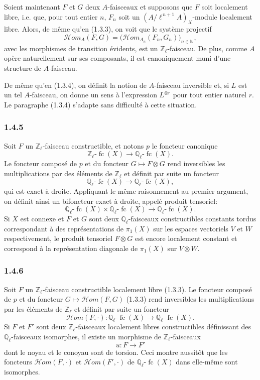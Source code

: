 \documentclass[11pt]{article}
\providecommand{\cHom}{\mathcal{H}om}
\providecommand{\fc}{\operatorname{fc}}
\begin{document}
Soient maintenant \(F\) et \(G\) deux \(A\)-faisceaux et supposons que \(F\) soit localement libre, i.e. que, pour tout entier \(n\), \(F_n\) soit un \((A/\ell^{\,n+1}A)_X\)-module localement libre. Alors, de même qu'en (1.3.3), on voit que le système projectif
\[
\cHom_A(F,G)=\bigl(\cHom_{A_n}(F_n,G_n)\bigr)_{n\in\mathbb N},
\]
avec les morphismes de transition évidents, est un \(\mathbb Z_\ell\)-faisceau. De plus, comme \(A\) opère naturellement sur ses composants, il est canoniquement muni d'une structure de \(A\)-faisceau.

De même qu'en (1.3.4), on définit la notion de \(A\)-faisceau inversible et, si \(L\) est un tel \(A\)-faisceau, on donne un sens à l'expression \(L^{\otimes r}\) pour tout entier naturel \(r\). Le paragraphe (1.3.4) s'adapte sans difficulté à cette situation.

\subsubsection*{1.4.5}
Soit \(F\) un \(\mathbb Z_\ell\)-faisceau constructible, et notons \(p\) le foncteur canonique
\[
\mathbb Z_\ell\text{-}\fc(X)\longrightarrow \mathbb Q_\ell\text{-}\fc(X).
\]
Le foncteur composé de \(p\) et du foncteur \(G\mapsto F\otimes G\) rend inversibles les multiplications par des éléments de \(\mathbb Z_\ell\) et définit par suite un foncteur
\[
\mathbb Q_\ell\text{-}\fc(X)\longrightarrow \mathbb Q_\ell\text{-}\fc(X),
\]
qui est exact à droite. Appliquant le même raisonnement au premier argument, on définit ainsi un bifoncteur exact à droite, appelé produit tensoriel:
\[
\mathbb Q_\ell\text{-}\fc(X)\times \mathbb Q_\ell\text{-}\fc(X)
\longrightarrow \mathbb Q_\ell\text{-}\fc(X).
\]
Si \(X\) est connexe et \(F\) et \(G\) sont deux \(\mathbb Q_\ell\)-faisceaux constructibles constants tordus correspondant à des représentations de \(\pi_1(X)\) sur les espaces vectoriels \(V\) et \(W\) respectivement, le produit tensoriel \(F\otimes G\) est encore localement constant et correspond à la représentation diagonale de \(\pi_1(X)\) sur \(V\otimes W\).

\subsubsection*{1.4.6}
Soit \(F\) un \(\mathbb Z_\ell\)-faisceau constructible localement libre (1.3.3). Le foncteur composé de \(p\) et du foncteur \(G\mapsto\cHom(F,G)\) (1.3.3) rend inversibles les multiplications par les éléments de \(\mathbb Z_\ell\) et définit par suite un foncteur
\[
\cHom(F,\cdot):\mathbb Q_\ell\text{-}\fc(X)\longrightarrow \mathbb Q_\ell\text{-}\fc(X).
\]
Si \(F\) et \(F'\) sont deux \(\mathbb Z_\ell\)-faisceaux localement libres constructibles définissant des \(\mathbb Q_\ell\)-faisceaux isomorphes, il existe un morphisme de \(\mathbb Z_\ell\)-faisceaux
\[
u:F\longrightarrow F'
\]
dont le noyau et le conoyau sont de torsion. Ceci montre aussitôt que les foncteurs \(\cHom(F,\cdot)\) et \(\cHom(F',\cdot)\) de \(\mathbb Q_\ell\text{-}\fc(X)\) dans elle-même sont isomorphes.
\end{document}
